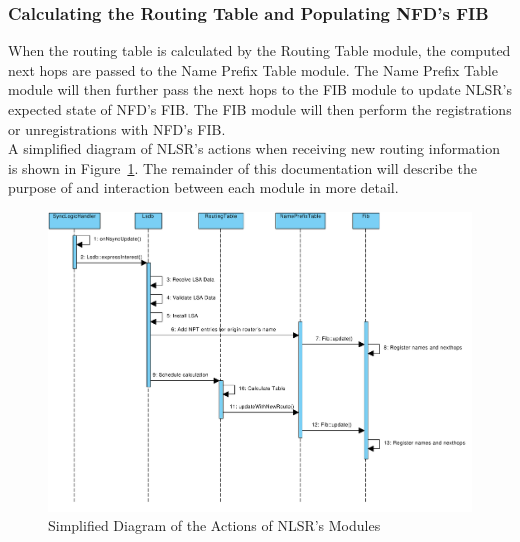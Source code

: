 \subsubsection{Calculating the Routing Table and Populating NFD's FIB}

When the routing table is calculated by the Routing Table module, the computed next hops are passed to the Name Prefix Table module.
The Name Prefix Table module will then further pass the next hops to the FIB module to update NLSR's expected state of NFD's FIB.
The FIB module will then perform the registrations or unregistrations with NFD's FIB.\\

A simplified diagram of NLSR's actions when receiving new routing information is shown in Figure~\ref{fig:system-interaction}.
The remainder of this documentation will describe the purpose of and interaction between each module in more detail.

\begin{figure}
\center
\includegraphics[width=\linewidth]{figures/system-interaction.pdf}
\caption{Simplified Diagram of the Actions of NLSR's Modules}
\label{fig:system-interaction}
\end{figure}

